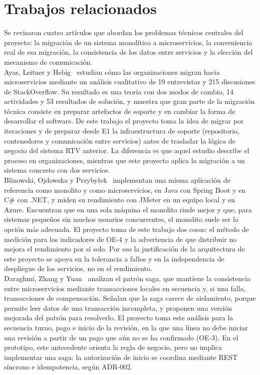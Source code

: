 \documentclass[11pt,a4paper]{article}
\begin{document}
\section{Trabajos relacionados}
Se revisaron cuatro artículos que abordan los problemas técnicos centrales del proyecto: la migración de un sistema monolítico a microservicios, la conveniencia real de esa migración, la consistencia de los datos entre servicios y la elección del mecanismo de comunicación.\\

Ayas, Leitner y Hebig~\cite{ayas2023migration} estudian cómo las organizaciones migran hacia microservicios mediante un análisis cualitativo de 19 entrevistas y 215 discusiones de StackOverflow. Su resultado es una teoría con dos modos de cambio, 14 actividades y 53 resultados de solución, y muestra que gran parte de la migración técnica consiste en preparar artefactos de soporte y en cambiar la forma de desarrollar el software. De este trabajo el proyecto toma la idea de migrar por iteraciones y de preparar desde E1 la infraestructura de soporte (repositorio, contenedores y comunicación entre servicios) antes de trasladar la lógica de negocio del sistema RTV anterior. La diferencia es que aquel estudio describe el proceso en organizaciones, mientras que este proyecto aplica la migración a un sistema concreto con dos servicios.
\\
Blinowski, Ojdowska y Przybyłek~\cite{blinowski2022monolithic} implementan una misma aplicación de referencia como monolito y como microservicios, en Java con Spring Boot y en C\# con .NET, y miden su rendimiento con JMeter en un equipo local y en Azure. Encuentran que en una sola máquina el monolito rinde mejor y que, para sistemas pequeños sin muchos usuarios concurrentes, el monolito suele ser la opción más adecuada. El proyecto toma de este trabajo dos cosas: el método de medición para los indicadores de OE-4 y la advertencia de que distribuir no mejora el rendimiento por sí solo. Por eso la justificación de la arquitectura de este proyecto se apoya en la tolerancia a fallos y en la independencia de despliegue de los servicios, no en el rendimiento.
\\

Daraghmi, Zhang y Yuan~\cite{daraghmi2022saga} analizan el patrón saga, que mantiene la consistencia entre microservicios mediante transacciones locales en secuencia y, si una falla, transacciones de compensación. Señalan que la saga carece de aislamiento, porque permite leer datos de una transacción incompleta, y proponen una versión mejorada del patrón para resolverlo. El proyecto toma este análisis para la secuencia turno, pago e inicio de la revisión, en la que una línea no debe iniciar una revisión a partir de un pago que aún no se ha confirmado (OE-3). En el prototipo, este antecedente orienta la regla de negocio, pero no implica implementar una saga: la autorización de inicio se coordina mediante REST síncrono e idempotencia, según ADR-002.
\\
\end{document}
